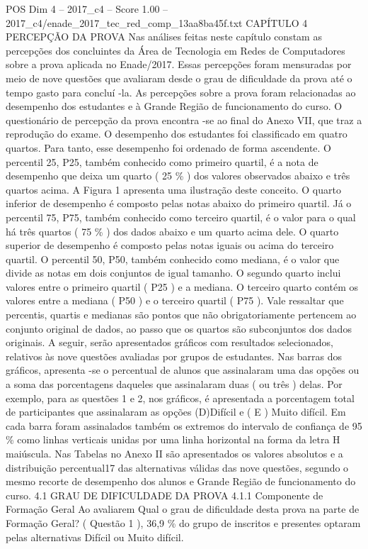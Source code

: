 \begin{textsample}{POS Dim 4 – 2017\_c4 – Score 1.00 – 2017\_c4/enade\_2017\_tec\_red\_comp\_13aa8ba45f.txt}  \label{ex:f4_pos_231}
CAPÍTULO 4 PERCEPÇÃO DA PROVA Nas análises feitas neste capítulo constam as percepções dos concluintes da Área de Tecnologia em Redes de Computadores sobre a prova aplicada no Enade/2017.
Essas percepções foram mensuradas por meio de nove questões que avaliaram desde o grau de dificuldade da prova até o tempo gasto para concluí -la.
As percepções sobre a prova foram relacionadas ao desempenho dos estudantes e à Grande Região de funcionamento do curso.
O questionário de percepção da prova encontra -se ao final do Anexo VII, que traz a reprodução do exame.
O desempenho dos estudantes foi classificado em quatro quartos.
Para tanto, esse desempenho foi ordenado de forma ascendente.
O percentil 25, P25, também conhecido como primeiro quartil, é a nota de desempenho que deixa um quarto ( 25 \% ) dos valores observados abaixo e três quartos acima.
A Figura 1 apresenta uma ilustração deste conceito.
O quarto inferior de desempenho é composto pelas notas abaixo do primeiro quartil.
Já o percentil 75, P75, também conhecido como terceiro quartil, é o valor para o qual há três quartos ( 75 \% ) dos dados abaixo e um quarto acima dele.
O quarto superior de desempenho é composto pelas notas iguais ou acima do terceiro quartil.
O percentil 50, P50, também conhecido como mediana, é o valor que divide as notas em dois conjuntos de igual tamanho.
O segundo quarto inclui valores entre o primeiro quartil ( P25 ) e a mediana.
O terceiro quarto contém os valores entre a mediana ( P50 ) e o terceiro quartil ( P75 ).
Vale ressaltar que percentis, quartis e medianas são pontos que não obrigatoriamente pertencem ao conjunto original de dados, ao passo que os quartos são subconjuntos dos dados originais.
A seguir, serão apresentados gráficos com resultados selecionados, relativos às nove questões avaliadas por grupos de estudantes.
Nas barras dos gráficos, apresenta -se o percentual de alunos que assinalaram uma das opções ou a soma das porcentagens daqueles que assinalaram duas ( ou três ) delas.
Por exemplo, para as questões 1 e 2, nos gráficos, é apresentada a porcentagem total de participantes que assinalaram as opções (D)Difícil e ( E ) Muito difícil.
Em cada barra foram assinalados também os extremos do intervalo de confiança de 95 \% como linhas verticais unidas por uma linha horizontal na forma da letra H maiúscula.
Nas Tabelas no Anexo II são apresentados os valores absolutos e a distribuição percentual17 das alternativas válidas das nove questões, segundo o mesmo recorte de desempenho dos alunos e Grande Região de funcionamento do curso. 4.1 GRAU DE DIFICULDADE DA PROVA 4.1.1 Componente de Formação Geral Ao avaliarem Qual o grau de dificuldade desta prova na parte de Formação Geral? ( Questão 1 ), 36,9 \% do grupo de inscritos e presentes optaram pelas alternativas Difícil ou Muito difícil.

\end{textsample}
